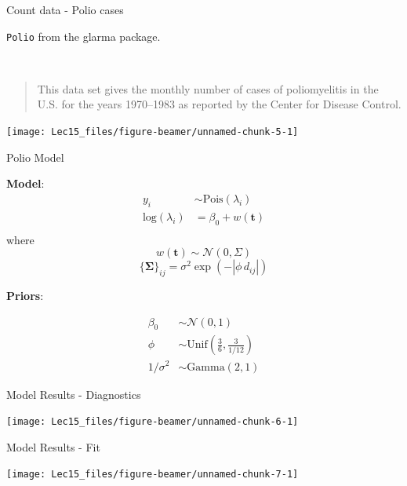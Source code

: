\documentclass[11pt,ignorenonframetext,]{beamer}
\begin{document}
\begin{frame}[fragile]{Count data - Polio cases}
\protect\hypertarget{count-data---polio-cases}{}

\texttt{Polio} from the glarma package.

\(~\)

\begin{quote}
This data set gives the monthly number of cases of poliomyelitis in the
U.S. for the years 1970--1983 as reported by the Center for Disease
Control.
\end{quote}

\begin{center}\texttt{[image: Lec15\_files/figure-beamer/unnamed-chunk-5-1]} \end{center}

\end{frame}

\begin{frame}{Polio Model}
\protect\hypertarget{polio-model}{}

\textbf{Model}: \[\begin{aligned}
y_i &\sim \text{Pois}(\lambda_i) \\
\text{log}(\lambda_i) 
  &= \beta_0 + w(\symbf{t}) \\
\end{aligned}\] where \[ w(\symbf{t}) \sim \mathcal{N}(0,\Sigma) \]
\[\{\symbf{\Sigma}\}_{ij} = \sigma^2 \exp(-|\phi \, d_{ij}|)\]

\textbf{Priors}:

\[
\begin{aligned}
\beta_0 &\sim \mathcal{N}(0,1) \\
\phi &\sim \text{Unif}\left(\frac{3}{6}, \frac{3}{1/12}\right)\\
1/\sigma^2 &\sim \text{Gamma}(2,1)
\end{aligned}
\]

\end{frame}

\begin{frame}{Model Results - Diagnostics}
\protect\hypertarget{model-results---diagnostics-1}{}

\begin{center}\texttt{[image: Lec15\_files/figure-beamer/unnamed-chunk-6-1]} \end{center}

\end{frame}

\begin{frame}{Model Results - Fit}
\protect\hypertarget{model-results---fit-1}{}

\begin{center}\texttt{[image: Lec15\_files/figure-beamer/unnamed-chunk-7-1]} \end{center}

\end{frame}
\end{document}
